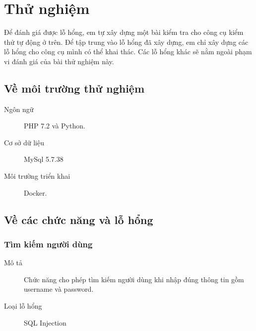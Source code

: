 \documentclass[./../main.tex]{subfiles}
\begin{document}

\section{Thử nghiệm}

Để đánh giá được lỗ hổng, em tự xây dựng một bài kiểm tra cho công cụ kiểm
thử tự động ở trên. Để tập trung vào lỗ hổng đã xây dựng, em chỉ xây dựng
các lỗ hổng cho công cụ mình có thể khai thác. Các lỗ hổng khác sẽ nằm
ngoài phạm vi đánh giá của bài thử nghiệm này.

\subsection{Về môi trường thử nghiệm}

\begin{description}
	\item[Ngôn ngữ] PHP 7.2 và Python.
	\item [Cơ sở dữ liệu] MySql 5.7.38
	\item [Môi trường triển khai] Docker.
\end{description}

\subsection{Về các chức năng và lỗ hổng}

\subsubsection{Tìm kiếm người dùng}

\begin{description}
	\item[Mô tả] Chức năng cho phép tìm kiếm người dùng khi nhập đúng
	      thông tin gồm username và password.
	\item [Loại lỗ hổng] SQL Injection
\end{description}
\end{document}
